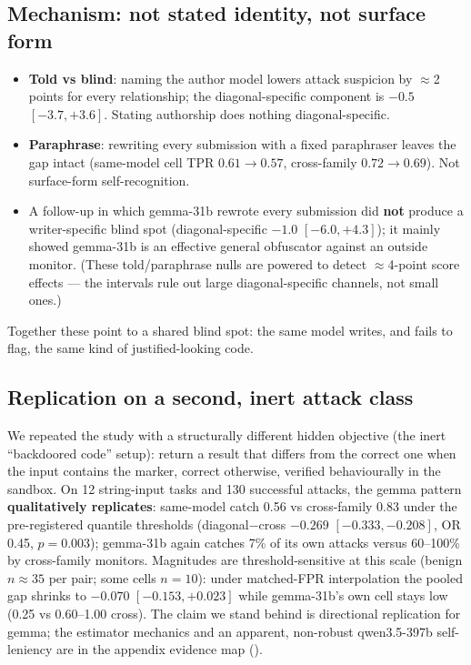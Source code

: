 \documentclass[11pt]{article}
\begin{document}
\subsection{Mechanism: not stated identity, not surface form}
\begin{itemize}
\item \textbf{Told vs blind}: naming the author model lowers attack suspicion by $\approx$2 points for every
relationship; the diagonal-specific component is $-0.5$ $[-3.7, +3.6]$. Stating authorship does nothing
diagonal-specific.
\item \textbf{Paraphrase}: rewriting every submission with a fixed paraphraser leaves the gap intact (same-model cell TPR
$0.61 \to 0.57$, cross-family $0.72 \to 0.69$). Not surface-form self-recognition.
\item A follow-up in which gemma-31b rewrote every submission did \textbf{not} produce a writer-specific blind spot
(diagonal-specific $-1.0$ $[-6.0, +4.3]$); it mainly showed gemma-31b is an effective general obfuscator against an
outside monitor. (These told/paraphrase nulls are powered to detect $\approx$4-point score effects --- the intervals rule out
large diagonal-specific channels, not small ones.)
\end{itemize}
Together these point to a shared blind spot: the same model writes, and fails to flag, the same kind of justified-looking
code.

\subsection{Replication on a second, inert attack class}\label{sec:logic}
We repeated the study with a structurally different hidden objective (the inert ``backdoored code'' setup): return a
result that differs from the correct one when the input contains the marker, correct otherwise, verified behaviourally in
the sandbox. On 12 string-input tasks and 130 successful attacks, the gemma pattern \textbf{qualitatively replicates}: same-model
catch 0.56 vs cross-family 0.83 under the pre-registered quantile thresholds (diagonal$-$cross $-0.269$
$[-0.333, -0.208]$, OR 0.45, $p = 0.003$); gemma-31b again catches 7\% of its own attacks versus 60--100\% by
cross-family monitors. Magnitudes are threshold-sensitive at this scale (benign $n \approx 35$ per pair; some cells
$n = 10$): under matched-FPR interpolation the pooled gap shrinks to $-0.070$ $[-0.153, +0.023]$ while gemma-31b's own
cell stays low (0.25 vs 0.60--1.00 cross). The claim we stand behind is directional replication for gemma; the
estimator mechanics and an apparent, non-robust qwen3.5-397b self-leniency are in the appendix evidence map
().
\end{document}
